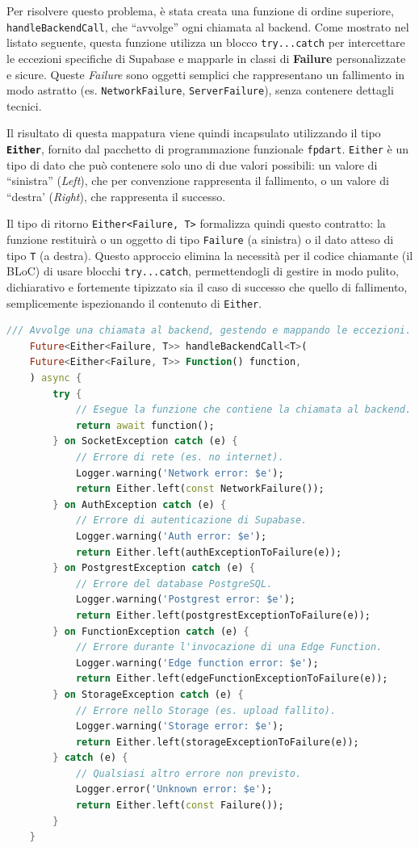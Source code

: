 Per risolvere questo problema, è stata creata una funzione di ordine superiore, \texttt{handleBackendCall}, che ``avvolge'' ogni chiamata al backend.
Come mostrato nel listato seguente, questa funzione utilizza un blocco \texttt{try...catch} per intercettare le eccezioni specifiche di Supabase e mapparle in classi di \textbf{Failure} personalizzate e sicure.
Queste \emph{Failure} sono oggetti semplici che rappresentano un fallimento in modo astratto (es. \texttt{NetworkFailure}, \texttt{ServerFailure}), senza contenere dettagli tecnici.

Il risultato di questa mappatura viene quindi incapsulato utilizzando il tipo \textbf{\texttt{Either}}, fornito dal pacchetto di programmazione funzionale \texttt{fpdart}. \texttt{Either} è un tipo di dato che può contenere solo uno di due valori possibili: un valore di ``sinistra'' (\emph{Left}), che per convenzione rappresenta il fallimento, o un valore di ``destra' (\emph{Right}), che rappresenta il successo.

Il tipo di ritorno \texttt{Either<Failure, T>} formalizza quindi questo contratto: la funzione restituirà o un oggetto di tipo \texttt{Failure} (a sinistra) o il dato atteso di tipo \texttt{T} (a destra).
Questo approccio elimina la necessità per il codice chiamante (il BLoC) di usare blocchi \texttt{try...catch}, permettendogli di gestire in modo pulito, dichiarativo e fortemente tipizzato sia il caso di successo che quello di fallimento, semplicemente ispezionando il contenuto di \texttt{Either}.

\begin{lstlisting}[language=Dart, caption={Funzione helper per la gestione sicura delle chiamate al backend.}, label={lst:handle-backend-call}]
	/// Avvolge una chiamata al backend, gestendo e mappando le eccezioni.
	Future<Either<Failure, T>> handleBackendCall<T>(
	Future<Either<Failure, T>> Function() function,
	) async {
		try {
			// Esegue la funzione che contiene la chiamata al backend.
			return await function();
		} on SocketException catch (e) {
			// Errore di rete (es. no internet).
			Logger.warning('Network error: $e');
			return Either.left(const NetworkFailure());
		} on AuthException catch (e) {
			// Errore di autenticazione di Supabase.
			Logger.warning('Auth error: $e');
			return Either.left(authExceptionToFailure(e));
		} on PostgrestException catch (e) {
			// Errore del database PostgreSQL.
			Logger.warning('Postgrest error: $e');
			return Either.left(postgrestExceptionToFailure(e));
		} on FunctionException catch (e) {
			// Errore durante l'invocazione di una Edge Function.
			Logger.warning('Edge function error: $e');
			return Either.left(edgeFunctionExceptionToFailure(e));
		} on StorageException catch (e) {
			// Errore nello Storage (es. upload fallito).
			Logger.warning('Storage error: $e');
			return Either.left(storageExceptionToFailure(e));
		} catch (e) {
			// Qualsiasi altro errore non previsto.
			Logger.error('Unknown error: $e');
			return Either.left(const Failure());
		}
	}
\end{lstlisting}

